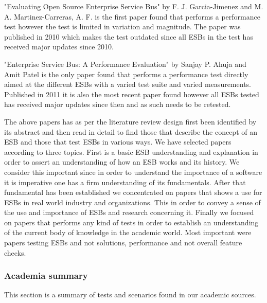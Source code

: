 "Evaluating Open Source Enterprise Service Bus" \cite{Garcia2010} by F. J. Garcia-Jimenez and M. A. Martinez-Carreras, A. F. is the first paper found that performs a performance test however the test is limited in variation and magnitude. The paper was published in 2010 which makes the test outdated since all ESBs in the test has received major updates since 2010.


"Enterprise Service Bus: A Performance Evaluation" \cite{Sanjay2011} by Sanjay P. Ahuja and Amit Patel  is the only paper found that performs a performance test directly aimed at the different ESBs with a varied test suite and varied measurements. Published in 2011 it is also the most recent paper found however all ESBs tested has received major updates since then and as such needs to be retested.


The above papers has as per the literature review design first been identified by its abstract and then read in detail to find those that describe the concept of an ESB and those that test ESBs in various ways. We have selected papers according to three topics. First is a basic ESB understanding and explanation in order to assert an understanding of how an ESB works and its history. We consider this important since in order to understand the importance of a software it is imperative one has a firm understanding of its fundamentals. After that fundamental has been established we concentrated on papers that shows a use for ESBs in real world industry and organizations. This in order to convey a sense of the use and importance of ESBs and research concerning it.
Finally we focused on papers that performs any kind of tests in order to establish an understanding of the current body of knowledge in the academic world. Most important were papers testing ESBs and not solutions, performance and not overall feature checks.


\subsubsection{Academia summary}
This section is a summary of tests and scenarios found in our academic sources.


